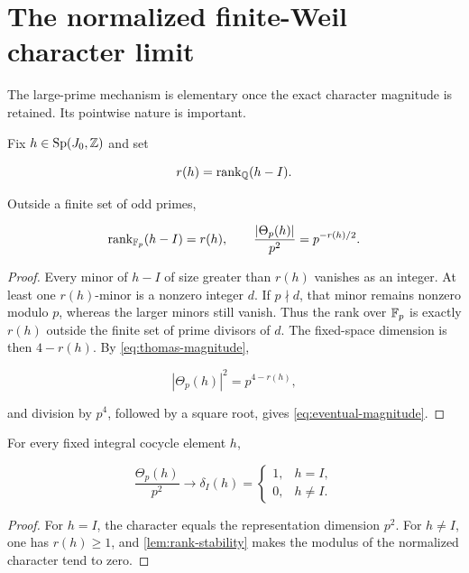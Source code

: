 \section{The normalized finite-Weil character limit}
\label{sec:character}

The large-prime mechanism is elementary once the exact character magnitude
is retained.  Its pointwise nature is important.

\begin{lemma}
\label{lem:rank-stability}
Fix \(h\in\operatorname{Sp}(J_0,\mathbb Z)\) and set

\[
 r(h)=\operatorname{rank}_{\mathbb Q}(h-I).
\]

Outside a finite set of odd primes,

\begin{equation}
 \operatorname{rank}_{\mathbb F_p}(h-I)=r(h),
 \qquad
 \frac{|\Theta_p(h)|}{p^2}=p^{-r(h)/2}.
 \label{eq:eventual-magnitude}
\end{equation}
\end{lemma}

\begin{proof}
Every minor of \(h-I\) of size greater than \(r(h)\) vanishes as an integer.
At least one \(r(h)\)-minor is a nonzero integer \(d\).  If \(p\nmid d\),
that minor remains nonzero modulo \(p\), whereas the larger minors still
vanish.  Thus the rank over \(\mathbb F_p\) is exactly \(r(h)\) outside the finite
set of prime divisors of \(d\).  The fixed-space dimension is then
\(4-r(h)\).  By \cref{eq:thomas-magnitude},

\[
 |\Theta_p(h)|^2=p^{4-r(h)},
\]

and division by \(p^4\), followed by a square root, gives
\cref{eq:eventual-magnitude}.
\end{proof}

\begin{corollary}
\label{cor:regular-character}
For every fixed integral cocycle element \(h\),

\begin{equation}
 \frac{\Theta_p(h)}{p^2}\longrightarrow
 \delta_I(h)=
 \begin{cases}
 1,&h=I,\\
 0,&h\ne I.
 \end{cases}
 \label{eq:regular-character}
\end{equation}
\end{corollary}

\begin{proof}
For \(h=I\), the character equals the representation dimension \(p^2\).
For \(h\ne I\), one has \(r(h)\ge1\), and
\cref{lem:rank-stability} makes the modulus of the normalized character tend
to zero.
\end{proof}

